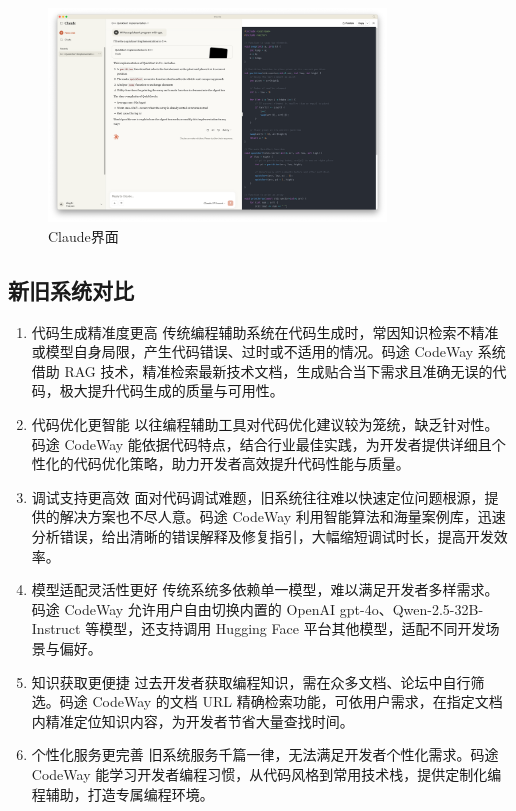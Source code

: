 \documentclass[
    report,     %
    oneside,    %
    UTF8,       %
    zihao=-4    %
]{config} %
\begin{document}
\begin{enumerate}[label=(\arabic*)]
\begin{figure}[h]
    \centering %
    \includegraphics[width=0.8\textwidth]{figures/claude.pdf}
    \caption{Claude界面} %
    \label{fig:Claude} %
\end{figure}
\end{enumerate}
\subsection{新旧系统对比}
\begin{enumerate}[label=(\arabic*)]
    \item 代码生成精准度更高
传统编程辅助系统在代码生成时，常因知识检索不精准或模型自身局限，产生代码错误、过时或不适用的情况。码途 CodeWay 系统借助 RAG 技术，精准检索最新技术文档，生成贴合当下需求且准确无误的代码，极大提升代码生成的质量与可用性。
    \item 代码优化更智能
以往编程辅助工具对代码优化建议较为笼统，缺乏针对性。码途 CodeWay 能依据代码特点，结合行业最佳实践，为开发者提供详细且个性化的代码优化策略，助力开发者高效提升代码性能与质量。
    \item 调试支持更高效
面对代码调试难题，旧系统往往难以快速定位问题根源，提供的解决方案也不尽人意。码途 CodeWay 利用智能算法和海量案例库，迅速分析错误，给出清晰的错误解释及修复指引，大幅缩短调试时长，提高开发效率。
    \item 模型适配灵活性更好
传统系统多依赖单一模型，难以满足开发者多样需求。码途 CodeWay 允许用户自由切换内置的 OpenAI gpt-4o、Qwen-2.5-32B-Instruct 等模型，还支持调用 Hugging Face 平台其他模型，适配不同开发场景与偏好。
    \item 知识获取更便捷
过去开发者获取编程知识，需在众多文档、论坛中自行筛选。码途 CodeWay 的文档 URL 精确检索功能，可依用户需求，在指定文档内精准定位知识内容，为开发者节省大量查找时间。
    \item 个性化服务更完善
旧系统服务千篇一律，无法满足开发者个性化需求。码途 CodeWay 能学习开发者编程习惯，从代码风格到常用技术栈，提供定制化编程辅助，打造专属编程环境。
\end{enumerate}
\end{document}
